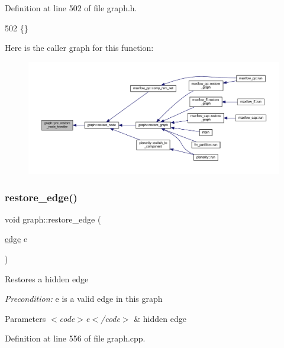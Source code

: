 Definition at line 502 of file graph.\+h.


\begin{DoxyCode}
502 \{\}       
\end{DoxyCode}
Here is the caller graph for this function\+:
\nopagebreak
\begin{figure}[H]
\begin{center}
\leavevmode
\includegraphics[width=350pt]{classgraph_a3a305d240ab5237a2adae315b50105a6_icgraph}
\end{center}
\end{figure}
\mbox{\label{classgraph_a2e5426682a0897b9f9104b019970bedc}} 
\subsubsection{\texorpdfstring{restore\+\_\+edge()}{restore\_edge()}}
{\footnotesize\ttfamily void graph\+::restore\+\_\+edge (\begin{DoxyParamCaption}\item[{\mbox{\hyperlink{classedge}{edge}}}]{e }\end{DoxyParamCaption})}

Restores a hidden edge

{\itshape Precondition\+:} {\ttfamily e} is a valid edge in this graph


\begin{DoxyParams}{Parameters}
{\em $<$code$>$e$<$/code$>$} & hidden edge \\
\hline
\end{DoxyParams}


Definition at line 556 of file graph.\+cpp.


